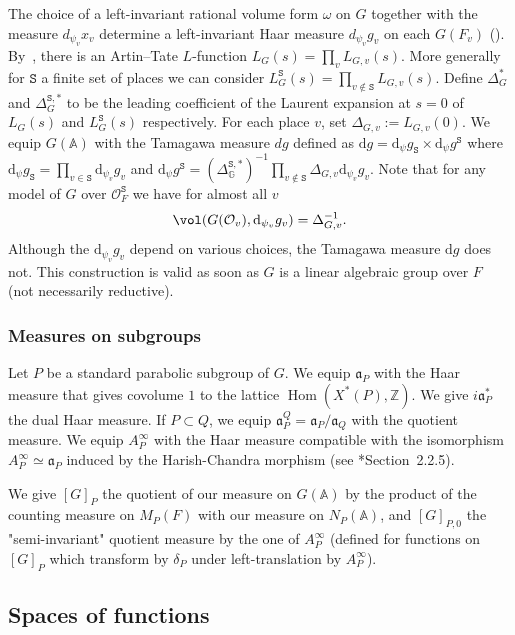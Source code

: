 \documentclass[letterpaper,11pt]{amsart}
\newcommand{\fa}{\mathfrak{a}}
\newcommand{\bA}{\mathbb{A}}
\newcommand{\G}{\mathbb{G}}
\newcommand{\Z}{\mathbb{Z}}
\newcommand{\cO}{\mathcal{O}}
\newcommand{\rd}{\mathrm{d}}
\newcommand{\tS}{\mathtt{S}}
\newcommand{\<}{\negthickspace}
\DeclareMathOperator{\Hom}{Hom}
\theoremstyle{definition}
\theoremstyle{plain}
\theoremstyle{remark}
\numberwithin{equation}{section}
\begin{document}
The choice of a left-invariant rational volume form $\omega$ on $G$ together with the measure $d_{\psi_v} x_v$ determine a left-invariant Haar measure $d_{\psi_v} g_v$ on each $G(F_v)$ (\cite{Wei}). By~\cite{Gro97}, there is an Artin--Tate $L$-function $L_{G}(s)=\prod_v L_{G,v}(s)$. More generally for $\tS$ a finite set of places we can consider $L_{G}^{\tS}(s)=\prod_{v \notin \tS} L_{G,v}(s)$. Define $\Delta_{G}^*$ and $\Delta_{G}^{\tS,*}$ to be the leading coefficient of the Laurent expansion at $s=0$ of $L_{G}(s)$ and $L_{G}^{\tS}(s)$ respectively. For each place $v$, set $\Delta_{G,v}:=L_{G,v}(0)$. We equip $G(\bA)$ with the Tamagawa measure $d g$ defined as $\rd g=\rd_\psi g_{\tS} \times \rd_\psi g^{\tS}$ where $\rd_\psi g_{\tS}=\prod_{v \in \tS} \rd_{\psi_v} g_v$ and $\rd_\psi g^{\tS}=(\Delta_{\G}^{\tS,*})^{-1}\prod_{v \notin \tS} \Delta_{G,v} \rd_{\psi_v} g_v$. Note that for any model of $G$ over $\cO_F^{\tS}$ we have for almost all $v$
\begin{equation}
\label{eq:Delta}
    \vol(G(\cO_v),\rd_{\psi_v} g_v)=\Delta_{G,v}^{-1}.
\end{equation}
Although the $\rd_{\psi_v} g_v$ depend on various choices, the Tamagawa measure $\rd g$ does not. This construction is valid as soon as $G$ is a linear algebraic group over $F$ (not necessarily reductive).

\subsubsection{Measures on subgroups} \label{subsubsec:first_measure} 
Let $P$ be a standard parabolic subgroup of $G$. We equip $\fa_P$ with the Haar measure that gives covolume $1$ to the lattice $\Hom(X^*(P),\Z)$. We give $i \fa_P^*$ the dual Haar measure. If $P \subset Q$, we equip $\fa_P^Q=\fa_P/\fa_Q$ with the quotient measure. We equip $A_P^\infty$ with the Haar measure compatible with the isomorphism $A_P^\infty \simeq \fa_P$ induced by the Harish-Chandra morphism (see \cite{BPCZ}*{Section~2.2.5}).


We give $[G]_P$ the quotient of our measure on $G(\bA)$ by the product of the counting measure on $M_P(F)$ with our measure on $N_P(\bA)$, and $[G]_{P,0}$ the "semi-invariant" quotient measure by the one of $A_P^\infty$ (defined for functions on $[G]_P$ which transform by $\delta_P$ under left-translation by $A_P^\infty$).

\subsection{Spaces of functions}
\end{document}

